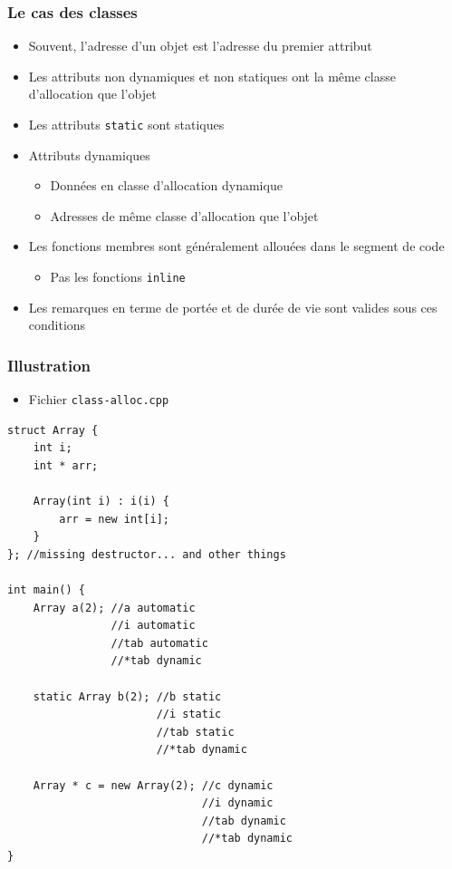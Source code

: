 \begin{frame}
\frametitle{Le cas des classes}
\begin{itemize}[<+->]
\item Souvent, l'adresse d'un objet est l'adresse du premier attribut
\item Les attributs non dynamiques et non statiques ont la même classe d'allocation que l'objet
\item Les attributs \lstinline|static| sont statiques
\item Attributs dynamiques
	\begin{itemize}
	\item Données en classe d'allocation dynamique
	\item Adresses de même classe d'allocation que l'objet
	\end{itemize}
\item Les fonctions membres sont généralement allouées dans le segment de code
	\begin{itemize}
	\item Pas les fonctions \lstinline|inline|
	\end{itemize}
\item Les remarques en terme de portée et de durée de vie sont valides sous ces conditions
\end{itemize}
\end{frame}

\begin{frame}[containsverbatim]
\frametitle{Illustration}
\begin{itemize}
\item Fichier \texttt{class-alloc.cpp}
\end{itemize}
\begin{lstlisting}
struct Array {
    int i;
    int * arr;
    
    Array(int i) : i(i) {
        arr = new int[i];
    }    
}; //missing destructor... and other things

int main() {
    Array a(2); //a automatic
                //i automatic
                //tab automatic
                //*tab dynamic    
    
    static Array b(2); //b static
                       //i static
                       //tab static
                       //*tab dynamic

    Array * c = new Array(2); //c dynamic
                              //i dynamic
                              //tab dynamic
                              //*tab dynamic
}
\end{lstlisting}
\end{frame}

